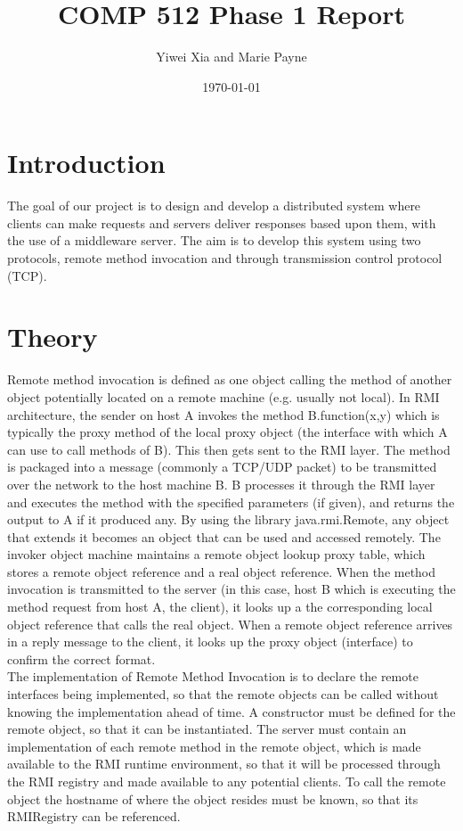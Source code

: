 \documentclass[letterpaper,12pt]{article}
\begin{document}
\title{COMP 512 Phase 1 Report}
\author{Yiwei Xia and Marie Payne}
\date{\today}
\maketitle

\section{Introduction}

The goal of our project is to design and develop a distributed system where clients can make requests and servers deliver responses based upon them, with the use of a middleware server. The aim is to develop this system using two protocols, remote method invocation and through transmission control protocol (TCP).

\section{Theory}
Remote method invocation is defined as one object calling the method of another object potentially located on a remote machine (e.g. usually not local). In RMI architecture, the sender on host A invokes the method B.function(x,y) which is typically the proxy method of the local proxy object (the interface with which A can use to call methods of B). This then gets sent to the RMI layer. The method is packaged into a message (commonly a TCP/UDP packet) to be transmitted over the network to the host machine B. B processes it through the RMI layer and executes the method with the specified parameters (if given), and returns the output to A if it produced any. By using the library java.rmi.Remote, any object that extends it becomes an object that can be used and accessed remotely. The invoker object machine maintains a remote object lookup proxy table, which stores a remote object reference and a real object reference. When the method invocation is transmitted to the server (in this case, host B which is executing the method request from host A, the client), it looks up a the corresponding local object reference that calls the real object. When a remote object reference arrives in a reply message to the client, it looks up the proxy object (interface) to confirm the correct format. \\

The implementation of Remote Method Invocation is to declare the remote interfaces being implemented, so that the remote objects can be called without knowing the implementation ahead of time. A constructor must be defined for the remote object, so that it can be instantiated. The server must contain an implementation of each remote method in the remote object, which is made available to the RMI runtime environment, so that it will be processed through the RMI registry and made available to any potential clients. To call the remote object the hostname of where the object resides must be known, so that its RMIRegistry can be referenced. \\
\end{document}
